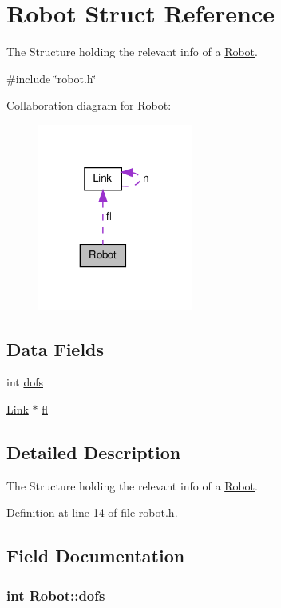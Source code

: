 \hypertarget{structRobot}{\section{Robot Struct Reference}
\label{structRobot}
}


The Structure holding the relevant info of a \hyperlink{structRobot}{Robot}.  




{\ttfamily \#include \char`\"{}robot.\-h\char`\"{}}



Collaboration diagram for Robot\-:\nopagebreak
\begin{figure}[H]
\begin{center}
\leavevmode
\includegraphics[width=145pt]{structRobot__coll__graph}
\end{center}
\end{figure}
\subsection*{Data Fields}
\begin{DoxyCompactItemize}
\item 
int \hyperlink{structRobot_a51d4a86ac5314a1ed8614d5664c80747}{dofs}
\item 
\hyperlink{structLink}{Link} $\ast$ \hyperlink{structRobot_aa983a42f95f55c494fd4154c4d42be47}{fl}
\end{DoxyCompactItemize}


\subsection{Detailed Description}
The Structure holding the relevant info of a \hyperlink{structRobot}{Robot}. 

Definition at line 14 of file robot.\-h.



\subsection{Field Documentation}
\hypertarget{structRobot_a51d4a86ac5314a1ed8614d5664c80747}{
\subsubsection[{dofs}]{\setlength{\rightskip}{0pt plus 5cm}int Robot\-::dofs}}\label{structRobot_a51d4a86ac5314a1ed8614d5664c80747}


